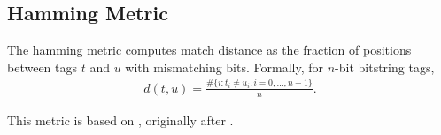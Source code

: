\subsection{Hamming Metric} \label{sec:hamming}

The hamming metric computes match distance as the fraction of positions between tags $t$ and $u$ with mismatching bits.
Formally, for $n$-bit bitstring tags,
\begin{align*}
d(t, u)
= \frac{
  \#\{ i : t_i \neq u_i, i=0, \dots ,n-1\}
}{
  n
}.
\end{align*}

This metric is based on \cite{lalejini2019else}, originally after \cite{hamming1950error}.
